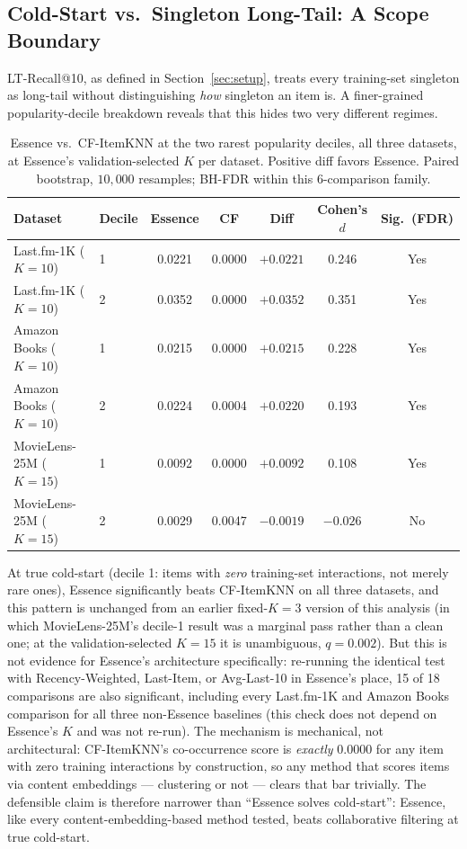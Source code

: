 \documentclass[11pt,a4paper]{article}
\begin{document}
\subsection{Cold-Start vs.\ Singleton Long-Tail: A Scope Boundary}
\label{sec:coldstart}

LT-Recall@10, as defined in Section~\ref{sec:setup}, treats every
training-set singleton as long-tail without distinguishing \emph{how}
singleton an item is. A finer-grained popularity-decile breakdown reveals
that this hides two very different regimes.

\begin{table}[H]
\centering
\caption{Essence vs.\ CF-ItemKNN at the two rarest popularity deciles, all
         three datasets, at Essence's validation-selected $K$ per dataset.
         Positive diff favors Essence. Paired bootstrap, $10{,}000$
         resamples; BH-FDR within this 6-comparison family.}
\label{tab:coldstart}
\small
\begin{tabular}{llccccc}
\toprule
\textbf{Dataset} & \textbf{Decile} & \textbf{Essence} & \textbf{CF} & \textbf{Diff} & \textbf{Cohen's $d$} & \textbf{Sig.\ (FDR)} \\
\midrule
Last.fm-1K ($K=10$)    & 1 & 0.0221 & 0.0000 & $+0.0221$ & 0.246 & Yes \\
Last.fm-1K ($K=10$)    & 2 & 0.0352 & 0.0000 & $+0.0352$ & 0.351 & Yes \\
Amazon Books ($K=10$)  & 1 & 0.0215 & 0.0000 & $+0.0215$ & 0.228 & Yes \\
Amazon Books ($K=10$)  & 2 & 0.0224 & 0.0004 & $+0.0220$ & 0.193 & Yes \\
MovieLens-25M ($K=15$) & 1 & 0.0092 & 0.0000 & $+0.0092$ & 0.108 & Yes \\
MovieLens-25M ($K=15$) & 2 & 0.0029 & 0.0047 & $-0.0019$ & $-0.026$ & No \\
\bottomrule
\end{tabular}
\end{table}

At true cold-start (decile 1: items with \emph{zero} training-set
interactions, not merely rare ones), Essence significantly beats
CF-ItemKNN on all three datasets, and this pattern is unchanged from an
earlier fixed-$K=3$ version of this analysis (in which MovieLens-25M's
decile-1 result was a marginal pass rather than a clean one; at the
validation-selected $K=15$ it is unambiguous, $q=0.002$). But this is not
evidence for Essence's architecture specifically: re-running the identical
test with Recency-Weighted, Last-Item, or Avg-Last-10 in Essence's place,
15 of 18 comparisons are also significant, including every Last.fm-1K and
Amazon Books comparison for all three non-Essence baselines (this check
does not depend on Essence's $K$ and was not re-run). The mechanism is
mechanical, not architectural: CF-ItemKNN's co-occurrence score is
\emph{exactly} $0.0000$ for any item with zero training interactions by
construction, so any method that scores items via content embeddings ---
clustering or not --- clears that bar trivially. The defensible claim is
therefore narrower than ``Essence solves cold-start'': Essence, like every
content-embedding-based method tested, beats collaborative filtering at
true cold-start.
\end{document}
